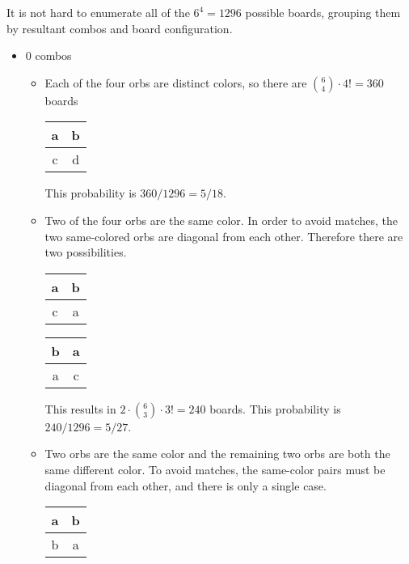 \documentclass[12pt]{article}
\theoremstyle{definition}
\begin{document}
It is not hard to enumerate all of the $6^4=1296$ possible boards, grouping them by resultant combos and board configuration.
\begin{itemize}
    \item 0 combos
    \begin{itemize}
        \item Each of the four orbs are distinct colors, so there are $\binom{6}{4}\cdot 4!=360$ boards
        \begin{center}
            \begin{tabular}{|c|c|}
            \hline
            a & b \\
            \hline
            c & d \\
            \hline
            \end{tabular}
        \end{center}
        This probability is $360/1296=5/18$.
        \item Two of the four orbs are the same color. In order to avoid matches, the two same-colored orbs are diagonal from each other. Therefore there are two possibilities.
        \begin{center}
            \begin{tabular}{|c|c|}
            \hline
            a & b \\
            \hline
            c & a \\
            \hline
            \end{tabular}
            \qquad
            \begin{tabular}{|c|c|}
            \hline
            b & a \\
            \hline
            a & c \\
            \hline
            \end{tabular}
        \end{center}
        This results in $2\cdot\binom{6}{3}\cdot 3!=240$ boards.
        This probability is $240/1296=5/27$.
        \item Two orbs are the same color and the remaining two orbs are both the same different color. To avoid matches, the same-color pairs must be diagonal from each other, and there is only a single case.
        \begin{center}
            \begin{tabular}{|c|c|}
            \hline
            a & b \\
            \hline
            b & a \\
            \hline

\end{tabular}
\end{center}
\end{itemize}
\end{itemize}
\end{document}
